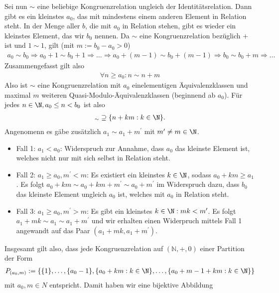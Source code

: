 \begin{solution}
\begin{itemize}
Sei nun $\sim$ eine beliebige Kongruenzrelation ungleich der Identitätsrelation.
Dann gibt es ein kleinstes $a_{0}$, das mit mindestens einem anderen Element in Relation steht. In der Menge aller $b$, die mit $a_{0}$ in
Relation stehen, gibt es wieder ein kleinstes Element, das wir $b_{0}$ nennen. Da $\sim$ eine Kongruenzrelation bezüglich $+$ ist und $1
\sim 1$, gilt (mit $m := b_{0}-a_{0} > 0$)
\begin{align*}
  a_{0} \sim b_{0} \Rightarrow a_{0}+1 \sim b_{0}+1 \Rightarrow \dots \Rightarrow a_{0}+(m-1) \sim b_{0}+(m-1) \Rightarrow b_{0} \sim
  b_{0}+m \Rightarrow \dots
\end{align*}
Zusammengefasst gilt also
\begin{align*}
  \forall n \geq a_0: n \sim n + m
\end{align*}
Also ist $\sim$ eine Kongruenzrelation mit $a_{0}$ einelementigen Äquivalenzklassen und maximal $m$ weiteren Quasi-Modulo-Äquivalenzklassen
(beginnend ab $a_{0}$).
Für jedes $n \in \N,a_0 \leq n < b_0$ ist also
\begin{align*}
  [n]_{\sim} \supseteq \{n + km: k \in \N\}.
\end{align*}
Angenomenn es gäbe zusätzlich $a_1 \sim a_1 + m^{\prime}$ mit $m^{\prime} \neq m \in \N$. \\
\begin{itemize}
\item Fall 1: $a_1 < a_0$:
Widerspruch zur Annahme, dass $a_0$ das kleinste Element ist, welches nicht nur
mit sich selbst in Relation steht.
  \item Fall 2: $a_1 \geq a_0, m^{\prime} < m$:
  Es existiert ein kleinstes $k \in \N$, sodass $a_0 + km \geq a_1$.
  Es folgt $a_0 + km \sim a_0 + km + m^{\prime} \sim a_0 + m^{\prime}$
  im Widerspruch dazu, dass $b_0$ das kleinste Element ungleich $a_0$ ist, welches mit
  $a_0$ in Relation steht.
  \item Fall 3: $a_1 \geq a_0, m^{\prime} > m$:
  Es gibt ein kleinstes $k \in \N: mk < m^{\prime}$.
  Es folgt $a_1 + mk \sim a_1 \sim a_1 + m^{\prime}$ und wir erhalten einen
  Widerpruch mittels Fall 1 angewandt auf das Paar $(a_1 + mk, a_1 + m^{\prime})$.
\end{itemize}
Insgesamt gilt also, dass jede Kongruenzrelation auf $(\mathbb{N},+,0)$ einer Partition
der Form
\begin{align*}
  P_{(a_0,m)} := \{\{1\},\dots,\{a_0 - 1\},\{a_0 + km: k \in \N\},\dots,\{a_0 + m - 1 + km: k \in \N\}\}
\end{align*}
mit $a_0,m \in N$ entspricht. Damit haben wir eine bijektive Abbildung

\end{itemize}
\end{solution}

